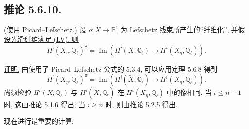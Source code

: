 \subsection*{推论 5.6.10.}
\textup{(使用 Picard--Lefschetz.)}
\underline{设 $\rho:\widetilde X\to\mathbb P^1$ 为 Lefschetz 线束所产生的\textquotedblleft 纤维化\textquotedblright{}, 并假设光滑纤维满足 (LV). 则}
\begin{equation}\tag{5.6.10.1}
H^i(X_{\bar\eta},\mathbb Q_\ell)^\pi
=\operatorname{Im}\!\left(
H^i(X,\mathbb Q_\ell)\longrightarrow
H^i(X_{\bar\eta},\mathbb Q_\ell)
\right).
\end{equation}

\underline{证明.}
由使用了 Picard--Lefschetz 公式的 5.3.4, 可以应用定理 5.6.8 得到
\[
H^i(X_{\bar\eta},\mathbb Q_\ell)^\pi
=\operatorname{Im}\!\left(
H^i(\widetilde X,\mathbb Q_\ell)\longrightarrow
H^i(X_{\bar\eta},\mathbb Q_\ell)
\right).
\]
尚须检验 $H^i(X,\mathbb Q_\ell)$ 与 $H^i(\widetilde X,\mathbb Q_\ell)$ 在 $H^i(X_{\bar\eta},\mathbb Q_\ell)$ 中的像相同. 当 $i\leq n-1$ 时, 这由推论 5.1.6 得出; 当 $i\geq n$ 时, 则由推论 5.2.5 得出.

现在进行最重要的计算:
